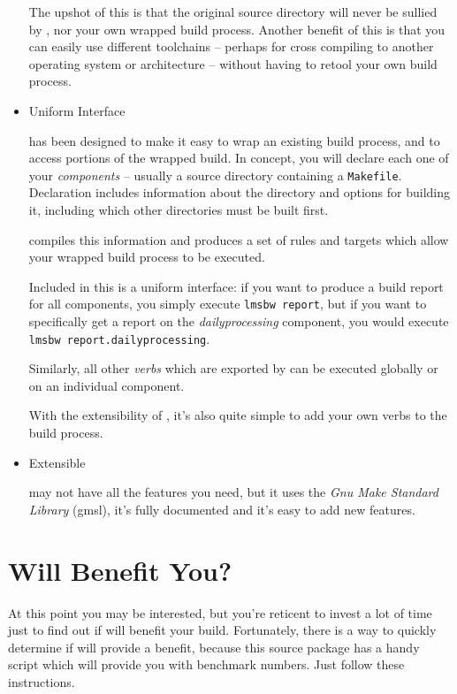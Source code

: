 \begin{itemize}
  The upshot of this is that the original source directory will never
  be sullied by \lmsbw, nor your own wrapped build process.  Another
  benefit of this is that you can easily use different toolchains --
  perhaps for cross compiling to another operating system or
  architecture -- without having to retool your own build process.

\item Uniform Interface

  \lmsbw has been designed to make it easy to wrap an existing build
  process, and to access portions of the wrapped build.  In concept,
  you will declare each one of your \emph{components} -- usually a source
  directory containing a \texttt{Makefile}.  Declaration includes
  information about the directory and options for building it,
  including which other directories must be built first.

  \lmsbw compiles this information and produces a set of \make rules
  and targets which allow your wrapped build process to be executed.

  Included in this is a uniform interface: if you want to produce a
  build report for all components, you simply execute \texttt{lmsbw
    report}, but if you want to specifically get a report on the
  \emph{dailyprocessing} component, you would execute \texttt{lmsbw
    report.dailyprocessing}.

  Similarly, all other \emph{verbs} which are exported by \lmsbw can
  be executed globally or on an individual component.

  With the extensibility of \lmsbw, it's also quite simple to add your
  own verbs to the build process.

\item Extensible

  \lmsbw may not have all the features you need, but it uses the
  \emph{Gnu Make Standard Library} (gmsl), it's fully documented and
  it's easy to add new features.

\end{itemize}

\section{Will \lmsbw Benefit You?}

At this point you may be interested, but you're reticent to invest a
lot of time just to find out if \lmsbw will benefit your build.
Fortunately, there is a way to quickly determine if \lmsbw will
provide a benefit, because this source package has a handy script
which will provide you with benchmark numbers.  Just follow these
instructions.

